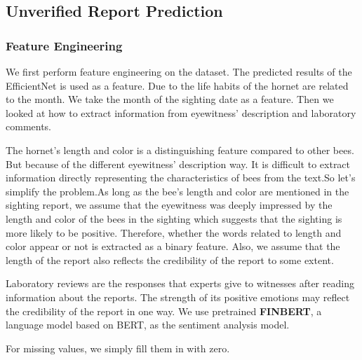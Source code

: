 \documentclass[12pt]{article}
\begin{document}
\subsection{Unverified Report Prediction}
\subsubsection{Feature Engineering}
We first perform feature engineering on the dataset. The predicted results of the EfficientNet is used as a feature. Due to the life habits of the hornet are related to the month. We take the month of the sighting date as a feature. Then we looked at how to extract information from eyewitness' description and laboratory comments.

The hornet's length and color is a distinguishing feature compared to other bees. But because of the different eyewitness' description way. It is difficult to extract information directly representing the characteristics of bees from the text.So let's simplify the problem.As long as the bee's length and color are mentioned in the sighting report, we assume that the eyewitness was deeply impressed by the length and color of the bees in the sighting which suggests that the sighting is more likely to be positive. Therefore, whether the words related to length and color appear or not is extracted as a binary feature. Also, we assume that the length of the report also reflects the credibility of the report to some extent.

Laboratory reviews are the responses that experts give to witnesses after reading information about the reports. The strength of its positive emotions may reflect the credibility of the report in one way. We use pretrained \textbf{FINBERT}\cite{sentiment_analysis}, a language model based on BERT\cite{BERT}, as the sentiment analysis model. 

For missing values, we simply fill them in with zero.
\end{document}
